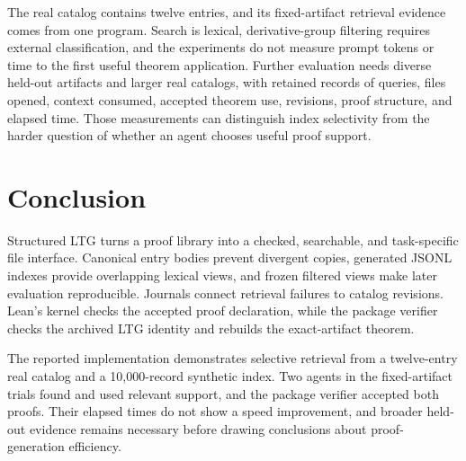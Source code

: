 \documentclass[10pt]{article}
\begin{document}
The real catalog contains twelve entries, and its fixed-artifact retrieval evidence comes from one program.  Search is lexical, derivative-group filtering requires external classification, and the experiments do not measure prompt tokens or time to the first useful theorem application.  Further evaluation needs diverse held-out artifacts and larger real catalogs, with retained records of queries, files opened, context consumed, accepted theorem use, revisions, proof structure, and elapsed time.  Those measurements can distinguish index selectivity from the harder question of whether an agent chooses useful proof support.

\section{Conclusion}

Structured LTG turns a proof library into a checked, searchable, and task-specific file interface.  Canonical entry bodies prevent divergent copies, generated JSONL indexes provide overlapping lexical views, and frozen filtered views make later evaluation reproducible.  Journals connect retrieval failures to catalog revisions.  Lean's kernel checks the accepted proof declaration, while the package verifier checks the archived LTG identity and rebuilds the exact-artifact theorem.

The reported implementation demonstrates selective retrieval from a twelve-entry real catalog and a 10,000-record synthetic index.  Two agents in the fixed-artifact trials found and used relevant support, and the package verifier accepted both proofs.  Their elapsed times do not show a speed improvement, and broader held-out evidence remains necessary before drawing conclusions about proof-generation efficiency.



\end{document}
